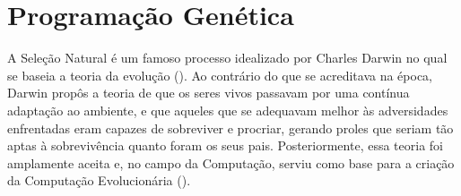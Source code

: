 

\section{Programação Genética}
\label{sec::pg}

A Seleção Natural é um famoso processo idealizado por Charles Darwin no qual se baseia a teoria da evolução (\cite{Darwin1859}). Ao contrário do que se acreditava na época, Darwin propôs a teoria de que os seres vivos passavam por uma contínua adaptação ao ambiente, e que aqueles que se adequavam melhor às adversidades enfrentadas eram capazes de sobreviver e procriar, gerando proles que seriam tão aptas à sobrevivência quanto foram os seus pais. 
Posteriormente, essa teoria foi amplamente aceita e, no campo da Computação, serviu como base para a criação da Computação Evolucionária (\cite{Goldberg89}).


